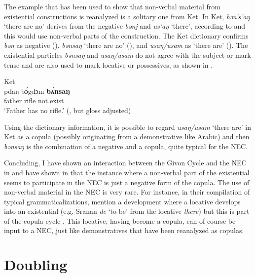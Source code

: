 \documentclass[output=paper,draft,draftmode,colorlinks,citecolor=brown]{langscibook}
\begin{document}
The example that has been used to show that non-verbal material from
existential constructions is reanalyzed is a solitary one from Ket.
In Ket, \textit{bən's’aŋ} `there are no' derives from the negative
\textit{bənj} and \textit{us'aŋ} `there', according to \textcite[136, but
without a reference]{Veselinova2015} and this would use non-verbal parts
of the construction. The Ket dictionary \parencite{KotorovaNefedov2015}
confirms \textit{bən} as negative (\citeyear[135]{KotorovaNefedov2015}),
\textit{bənsaŋ} `there are no' (\citeyear[136]{KotorovaNefedov2015}), and
\textit{usaŋ\slash usam} as `there are'
(\citeyear[415]{KotorovaNefedov2015}). The existential particles
\textit{bənsaŋ} and \textit{usaŋ\slash usam} do not agree with the subject
or mark tense and are also used to mark locative or possessives, as shown
in .
%
\begin{exe}\ex Ket \label{ex:other-ket-rifle}\\
    pdaŋ   b{\'ɔ}gdɔm    \textbf{b{\'ʌ}nsaŋ} \\
father  rifle    not.exist \\
    \glt `Father has no rifle.' (\citealt[65]{KotorovaNefedov2015}, but gloss adjusted)
    \end{exe}
%
Using the dictionary information, it is possible to regard
\textit{usaŋ\slash usam} `there are' in Ket as a copula (possibly originating
from a demonstrative like Arabic) and then \textit{bənsaŋ} is the
combination of a negative and a copula, quite typical for the NEC.

Concluding, I have shown an interaction between the Givon Cycle and the NEC
in  and have shown in  that the
instance where a non-verbal part of the existential seems to participate in
the NEC is just a negative form of the copula. The use of non-verbal
material in the NEC is very rare.  For instance, in their compilation of
typical grammaticalizations, \citet[199--206]{HeineKuteva2002} mention a
development where a locative develops into an existential (e.g.
Sranan \textit{de} `to be' from the locative \textit{there}) but
this is part of the copula cycle \parencite{Gelderen2015}. This locative,
having become a copula, can of course be input to a NEC, just like
demonstratives that have been reanalyzed as copulas.

\section{Doubling}\label{sec:oth-4}
\end{document}
